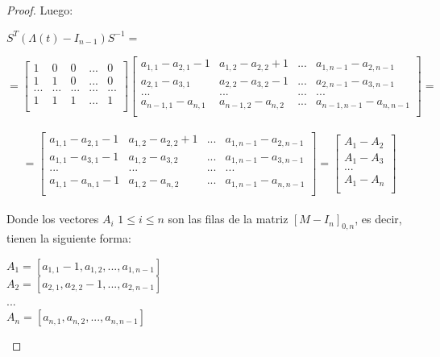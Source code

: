 \begin{lem}
\begin{proof}
	           Luego:	          
	           \begin{center}
	            	$  S^{T}(\Lambda(t) - I_{n-1})S^{-1} =$
	           \end{center}
	           \[ = \begin{bmatrix}
	           1 & 0 & 0 &... & 0 \\
	           1 & 1 & 0 &...  & 0\\
	           ... & ... & ...& ... & ... \\		
	           1 & 1 & 1 & ... & 1\\
	           \end{bmatrix}
	           \begin{bmatrix}
	           a_{1,1}-a_{2,1}-1 & a_{1,2}-a_{2,2}+1 & ... & a_{1,n-1}-a_{2,n-1}  \\
	           a_{2,1}-a_{3,1} & a_{2,2}-a_{3,2}-1&... &  a_{2,n-1}-a_{3,n-1} \\
	           ... & ... & ... & ... \\	
	           a_{n-1,1}-a_{n,1} & a_{n-1,2}-a_{n,2}&... &  a_{n-1,n-1}-a_{n,n-1} \\
	           \end{bmatrix}=\]\\
	           
	           \[ = \begin{bmatrix}
	           a_{1,1}-a_{2,1}-1 & a_{1,2}-a_{2,2}+1 & ... & a_{1,n-1}-a_{2,n-1}  \\
	           a_{1,1}-a_{3,1}-1 & a_{1,2}-a_{3,2}&... &  a_{1,n-1}-a_{3,n-1} \\
	           ... & ... & ... & ... \\	
	           a_{1,1}-a_{n,1}-1 & a_{1,2}-a_{n,2}&... &  a_{1,n-1}-a_{n,n-1} \\
	           \end{bmatrix} =
	           \begin{bmatrix}
	           A_{1} - A_{2} \\
	           A_{1} - A_{3} \\
	           ... \\	
	           A_{1} - A_{n} \\
	           \end{bmatrix}\]\\
	           
	           Donde los vectores $A_{i} $ $ 1 \le i \le n $ son las filas de la matriz $[M-I_{n}]_{0,n}$, es decir, tienen la siguiente forma:
			   \begin{center}
		           $ A_{1} = [a_{1,1}-1, a_{1,2},...,a_{1,n-1}] $\\
	               $ A_{2} = [a_{2,1}, a_{2,2}-1,...,a_{2,n-1}] $\\
	               ...\\
	               $ A_{n} = [a_{n,1}, a_{n,2},...,a_{n,n-1}] $\\
		       \end{center}
	           

\end{proof}
\end{lem}
